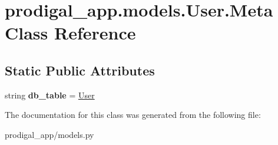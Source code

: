 \hypertarget{classprodigal__app_1_1models_1_1_user_1_1_meta}{}\section{prodigal\+\_\+app.\+models.\+User.\+Meta Class Reference}
\label{classprodigal__app_1_1models_1_1_user_1_1_meta}
\subsection*{Static Public Attributes}
\begin{DoxyCompactItemize}
\item 
\mbox{\label{classprodigal__app_1_1models_1_1_user_1_1_meta_accddeaba8a1b27065a24c6366b63b7a4}} 
string {\bfseries db\+\_\+table} = \textquotesingle{}\mbox{\hyperlink{classprodigal__app_1_1models_1_1_user}{User}}\textquotesingle{}
\end{DoxyCompactItemize}


The documentation for this class was generated from the following file\+:\begin{DoxyCompactItemize}
\item 
prodigal\+\_\+app/models.\+py\end{DoxyCompactItemize}

